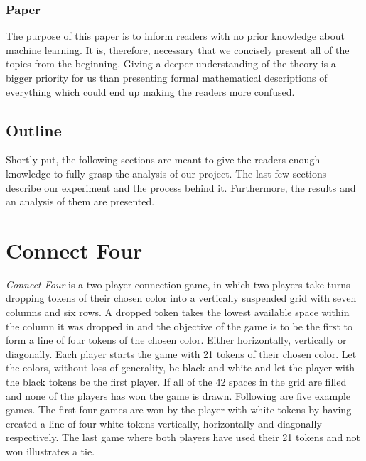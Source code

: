 \documentclass[titlepage]{article}
\begin{document}
\subsubsection{Paper}

\vskip 0.2cm

The purpose of this paper is to inform readers with no prior knowledge about machine learning. It is, therefore, necessary that we concisely present all of the topics from the beginning. Giving a deeper understanding of the theory is a bigger priority for us than presenting formal mathematical descriptions of everything which could end up making the readers more confused. 

\subsection{Outline}

\vskip 0.2cm

Shortly put, the following sections are meant to give the readers enough knowledge to fully grasp the analysis of our project. The last few sections describe our experiment and the process behind it. Furthermore, the results and an analysis of them are presented.

\newpage

\section{Connect Four}

\vskip 0.5cm

\emph{Connect Four} is a two-player connection game, in which two players take turns dropping tokens of their chosen color into a vertically suspended grid with seven columns and six rows. A dropped token takes the lowest available space within the column it was dropped in and the objective of the game is to be the first to form a line of four tokens of the chosen color. Either horizontally, vertically or diagonally. Each player starts the game with 21 tokens of their chosen color. Let the colors, without loss of generality, be black and white and let the player with the black tokens be the first player. If all of the 42 spaces in the grid are filled and none of the players has won the game is drawn. Following are five example games. The first four games are won by the player with white tokens by having created a line of four white tokens vertically, horizontally and diagonally respectively. The last game where both players have used their 21 tokens and not won illustrates a tie.
\end{document}
